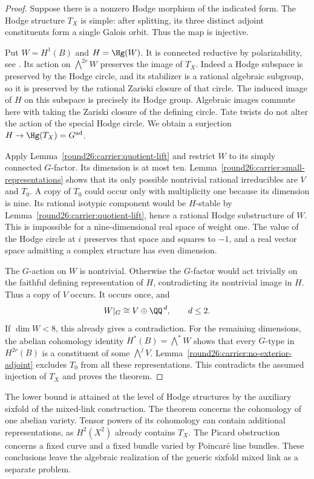 \begin{proof}
Suppose there is a nonzero Hodge morphism of the indicated
form. The Hodge structure $T_X$ is simple: after splitting,
its three distinct adjoint constituents form a single
Galois orbit. Thus the map is injective.

Put $W=H^1(B)$ and $H=\Hg(W)$. It is connected reductive by
polarizability, see \cite[Proposition~3.6]{Round26Del82}. Its action
on $\bigwedge^{2r}W$ preserves the image of $T_X$. Indeed a
Hodge subspace is preserved by the Hodge circle, and its
stabilizer is a rational algebraic subgroup, so it is
preserved by the rational Zariski closure of that circle.
The induced image of $H$ on this subspace is precisely its
Hodge group. Algebraic images commute here with taking the
Zariski closure of the defining circle. Tate twists do not
alter the action of the special Hodge circle. We obtain a
surjection $H\to\Hg(T_X)=G^{\mathrm{ad}}$.

Apply Lemma~\ref{round26:carrier:quotient-lift} and restrict $W$ to
its simply connected $G$-factor. Its dimension is at most
ten. Lemma~\ref{round26:carrier:small-representations} shows that
its only possible nontrivial rational irreducibles are $V$
and $T_0$. A copy of $T_0$ could occur only with multiplicity
one because its dimension is nine. Its rational isotypic
component would be $H$-stable by
Lemma~\ref{round26:carrier:quotient-lift}, hence a rational Hodge
substructure of $W$. This is impossible for a
nine-dimensional real space of weight one. The value of
the Hodge circle at $i$ preserves that space and squares to
$-1$, and a real vector space admitting a complex structure
has even dimension.

The $G$-action on $W$ is nontrivial. Otherwise the
$G$-factor would act trivially on the faithful defining
representation of $H$, contradicting its nontrivial image
in $H$. Thus a copy of $V$ occurs. It occurs once, and
\[
 W|_G\cong V\oplus\QQ^{\,d},\qquad d\le2.
\]
If $\dim W<8$, this already gives a contradiction.
For the remaining dimensions, the abelian cohomology
identity $H^*(B)=\bigwedge^*W$ shows that every $G$-type in
$H^{2r}(B)$ is a constituent of some $\bigwedge^jV$.
Lemma~\ref{round26:carrier:no-exterior-adjoint} excludes $T_0$
from all these representations. This contradicts the
assumed injection of $T_X$ and proves the theorem.
\end{proof}

\begin{remark}
The lower bound is attained at the level of Hodge structures
by the auxiliary sixfold of the mixed-link construction.
The theorem concerns the cohomology of one abelian variety.
Tensor powers of its cohomology can contain additional
representations, as $H^2(X^2)$ already contains $T_X$.
The Picard obstruction concerns a fixed curve and a fixed
bundle varied by Poincar\'e line bundles. These conclusions
leave the algebraic realization of the generic sixfold
mixed link as a separate problem.
\end{remark}